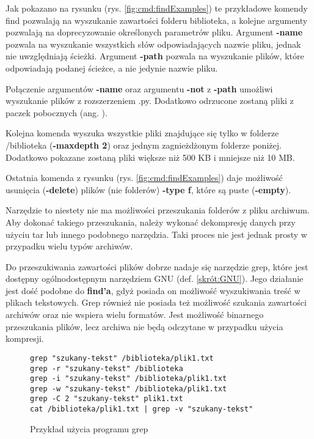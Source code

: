 Jak pokazano na rysunku (rys. \ref{fig:cmd:findExamples}) te przykładowe komendy find
pozwalają na wyszukanie zawartości folderu biblioteka, a kolejne argumenty 
pozwalają na doprecyzowanie określonych parametrów pliku. Argument \textbf{-name}
pozwala na wyszukanie wszystkich słów odpowiadających nazwie pliku, jednak nie
uwzględniają ścieżki. Argument \textbf{-path} pozwala na wyszukanie plików, 
które odpowiadają podanej ścieżce, a nie jedynie nazwie pliku.

Połączenie argumentów \textbf{-name} oraz argumentu \textbf{-not} z \textbf{-path}
umożliwi wyszukanie plików z rozszerzeniem .py. Dodatkowo odrzucone zostaną 
pliki z paczek pobocznych (ang. ).

Kolejna komenda wyszuka wszystkie pliki znajdujące się tylko w folderze 
/biblioteka (\textbf{-maxdepth 2}) oraz jednym zagnieżdżonym folderze poniżej.
Dodatkowo pokazane zostaną pliki większe niż 500 KB i mniejsze niż 10 MB.

Ostatnia komenda z rysunku (rys. \ref{fig:cmd:findExamples}) daje możliwość usunięcia 
(\textbf{-delete}) plików (nie folderów) \textbf{-type f}, które są puste (\textbf{-empty}).

Narzędzie to niestety nie ma możliwości przeszukania folderów z pliku
archiwum. Aby dokonać takiego przeszukania, należy wykonać dekompresję danych
przy użyciu tar lub innego podobnego narzędzia. Taki proces nie jest jednak 
prosty w przypadku wielu typów archiwów.

Do przeszukiwania zawartości plików dobrze nadaje się narzędzie grep, które jest
dostępny ogólnodostępnym narzędziem GNU (def. \ref{skrót:GNU}). Jego działanie jest dość podobne do \textbf{find'a},
gdyż posiada on możliwość wyszukiwania treść w plikach tekstowych. Grep również nie 
posiada też możliwość szukania zawartości archiwów oraz nie wspiera wielu 
formatów. Jest możliwość binarnego przeszukania plików, lecz archiwa nie będą 
odczytane w przypadku użycia kompresji.

\begin{figure}[htbp]
  \centering
\begin{tcolorbox}[
    colback=white,
    colframe=black,
    boxrule=0.5pt,
    arc=0pt
]
  \begin{verbatim}
grep "szukany-tekst" /biblioteka/plik1.txt 
grep -r "szukany-tekst" /biblioteka 
grep -i "szukany-tekst" /biblioteka/plik1.txt
grep -w "szukany-tekst" /biblioteka/plik1.txt
grep -C 2 "szukany-tekst" plik1.txt
cat /biblioteka/plik1.txt | grep -v "szukany-tekst" 
  \end{verbatim}
\end{tcolorbox}
\caption{Przykład użycia programu grep}
\label{fig:cmd:grepExamples}
\end{figure}

